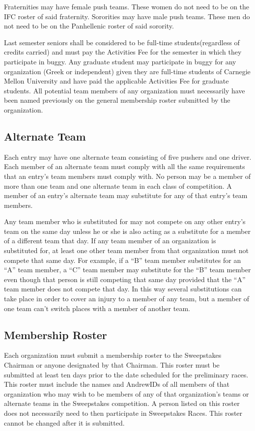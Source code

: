 	Fraternities may have female push teams. These women do not need to be on the IFC roster of said fraternity. Sororities may have male push teams. These men do not need to be on the Panhellenic roster of said sorority.

	Last semester seniors shall be considered to be full-time students(regardless of credits carried) and must pay the Activities Fee for the semester in which they participate in buggy. Any graduate student may participate in buggy for any organization (Greek or independent) given they are full-time students of Carnegie Mellon University and have paid the applicable Activities Fee for graduate students. All potential team members of any organization must necessarily have been named previously on the general membership roster submitted by the organization.

\subsection{Alternate Team}

	Each entry may have one alternate team consisting of five pushers and one driver. Each member of an alternate team must comply with all the same requirements that an entry's team members must comply with. No person may be a member of more than one team and one alternate team in each class of competition. A member of an entry's alternate team may substitute for any of that entry's team members.

	Any team member who is substituted for may not compete on any other entry's team on the same day unless he or she is also acting as a substitute for a member of a different team that day. If any team member of an organization is substituted for, at least one other team member from that organization must not compete that same day. For example, if a “B” team member substitutes for an “A” team member, a “C” team member may substitute for the “B” team member even though that person is still competing that same day provided that the “A” team member does not compete that day. In this way several substitutions can take place in order to cover an injury to a member of any team, but a member of one team can't switch places with a member of another team.	

\subsection{Membership Roster}

	Each organization must submit a membership roster to the Sweepstakes Chairman or anyone designated by that Chairman. This roster must be submitted at least ten days prior to the date scheduled for the preliminary races. This roster must include the names and AndrewIDs of all members of that organization who may wish to be members of any of that organization's teams or alternate teams in the Sweepstakes competition. A person listed on this roster does not necessarily need to then participate in Sweepstakes Races. This roster cannot be changed after it is submitted.

